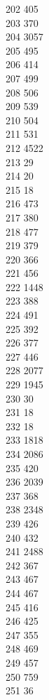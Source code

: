 { 202	405 \\
 203	370 \\
 204	3057 \\
 205	495 \\
 206	414 \\
 207	499 \\
 208	506 \\
 209	539 \\
 210	504 \\
 211	531 \\
 212	4522 \\
 213	29 \\
 214	20 \\
 215	18 \\
 216	473 \\
 217	380 \\
 218	477 \\
 219	379 \\
 220	366 \\
 221	456 \\
 222	1448 \\
 223	388 \\
 224	491 \\
 225	392 \\
 226	377 \\
 227	446 \\
 228	2077 \\
 229	1945 \\
 230	30 \\
 231	18 \\
 232	18 \\
 233	1818 \\
 234	2086 \\
 235	420 \\
 236	2039 \\
 237	368 \\
 238	2348 \\
 239	426 \\
 240	432 \\
 241	2488 \\
 242	367 \\
 243	467 \\
 244	467 \\
 245	416 \\
 246	425 \\
 247	355 \\
 248	469 \\
 249	457 \\
 250	759 \\
 251	36 \\
}
